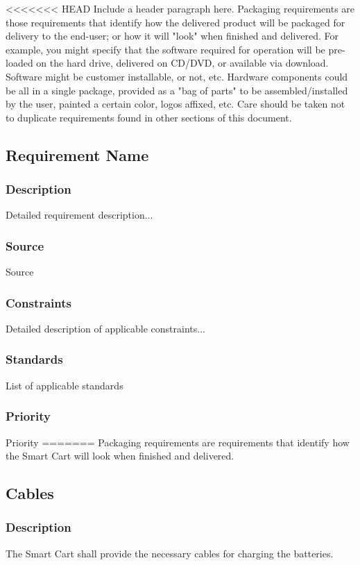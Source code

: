 <<<<<<< HEAD
Include a header paragraph here. Packaging requirements are those requirements that identify how the delivered product will be packaged for delivery to the end-user; or how it will "look" when finished and delivered. For example, you might specify that the software required for operation will be pre-loaded on the hard drive, delivered on CD/DVD, or available via download. Software might be customer installable, or not, etc. Hardware components could be all in a single package, provided as a "bag of parts" to be assembled/installed by the user, painted a certain color, logos affixed, etc. Care should be taken not to duplicate requirements found in other sections of this document.

\subsection{Requirement Name}
\subsubsection{Description}
Detailed requirement description...
\subsubsection{Source}
Source
\subsubsection{Constraints}
Detailed description of applicable constraints...
\subsubsection{Standards}
List of applicable standards
\subsubsection{Priority}
Priority
=======
Packaging requirements are requirements that identify how the Smart Cart will look when finished and delivered.

\subsection{Cables}
\subsubsection{Description}
The Smart Cart shall provide the necessary cables for charging the batteries.
